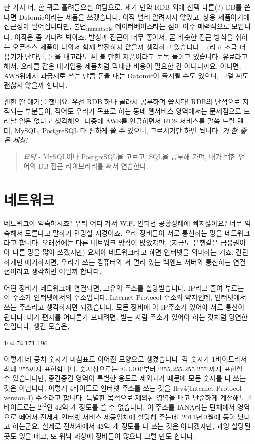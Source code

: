 \documentclass[11pt,a4paper]{article}
\newcommand{\sub}[1]{\textsubscript{#1}}
\begin{document}
한 가지 더, 한 귀로 흘려들으실 여담으로, 제가 만약 RDB 외에 선택 다른(?) DB를 쓴다면 Datomic이라는 제품을 쓰겠습니다. 아직 널리 알려지지 않았고, 상용 제품이기에 접근성이 떨어집니다만, 불변\sub{immutable} 데이터베이스라는 점이 아주 매력적으로 보입니다. 아직은 좀 기다려 봐야죠. 발상과 접근이 너무 좋아서, 곧 비슷한 접근 방식을 취하는 오픈소스 제품이 나와서 함께 발전하지 않을까 생각하고 있습니다. 그리고 조금 더 용기가 난다면, 돈을 내고라도 써 볼 만한 제품이라고 눈독 들이고 있습니다. 유료라고 해서, 오라클 같은 대기업용 제품처럼 막대한 비용이 필요한 건 아니니까요. 아니면, AWS위에서 과금제로 쓰는 만큼 돈을 내는 Datomic이 출시될 수도 있으니, 그걸 써도 괜찮지 않을까 합니다.

괜한 딴 얘기를 했네요. 우선 RDB 하나 골라서 공부하며 씁시다! RDB의 단점으로 지적되는 부분들이, 적어도 우리가 목표로 하는 동네 웹서비스 영역에서는 문제점으로 드러날 일은 없다고 생각해요. 나중에 AWS를 언급하면서 RDS 서비스를 말씀 드릴 텐데, MySQL, PostgreSQL 다 편하게 쓸 수 있으니, 고르시기만 하면 됩니다. \emph{거 참 좋은 세상!}

\begin{quote}
  \emph{요약} - MySQL이나 PostgreSQL을 고르고, SQL을 공부해 가며, 내가 택한 언어의 DB 접근 라이브러리를 써서 연습한다.
\end{quote}

\section{네트워크}
네트워크야 익숙하시죠? 우리 어디 가서 WiFi 안되면 공황상태에 빠지잖아요? 너무 익숙해서 모른다고 말하기 민망할 지경이죠. 우리 장비들이 서로 통신하는 망을 네트워크라고 합니다. 오래전에는 다른 네트워크 방식이 많았지만, (지금도 은행같은 금융권이야 다른 망을 많이 쓰겠지만) 요새야 네트워크라고 하면 인터넷을 의미하는 거죠. 간단하게만 얘기하자면, 우리가 쓰는 컴퓨터와 저 멀리 있는 백엔드 서버와 통신하는 연결선이라고 생각하면 어떨까 합니다.

어떤 장비가 네트워크에 연결되면, 고유의 주소를 할당받습니다. IP라고 줄여 부르는 이 주소가 인터넷에서의 주소입니다.  Internet Protocol 주소의 약자인데, 인터넷에서 쓰는 주소라고 생각하시면 되겠습니다. 모든 장비에 이 IP주소가 있어야 서로 통신이 됩니다. 내가 편지를 어디론가 보내려면, 받는 사람 주소가 있어야 하는 것처럼 당연한 일입니다. 생긴 모습은,

\begin{awquote}
104.74.171.196
\end{awquote}

이렇게 네 뭉치 숫자가 마침표로 이어진 모양으로 생겼습니다. 각 숫자가 1바이트라서 최대 255까지 표현합니다. 숫자상으로는 `0.0.0.0'부터 `255.255.255.255'까지 표현할 수 있습니다만, 중간중간 영역이 특별한 용도로 제외되기 때문에 모든 숫자를 다 쓰는 것은 아닙니다. 이렇게 4바이트로 인터넷 주소를 쓰는 것을 IPv4(Internet Protocol version 4) 주소라고 합니다. 특별한 목적으로 제외된 영역을 빼고 단순하게 계산해도 4바이트로는 $2^{32}$인 42억 개 정도를 쓸 수 없습니다. 이 주소를 IANA라는 단체에서 영역으로 떼어서 전세계 인터넷 서비스 제공업체에 할당해 주는데, 2011년 3월에 동이 났다고 하는군요. 실제로 전세계에서 42억 개 정도를 다 쓰는 것은 아니겠지만, 과잉 할당된 곳도 있을 테고, 또 워낙 세상에 장비들이 많으니 그럴 만도 합니다.
\end{document}
